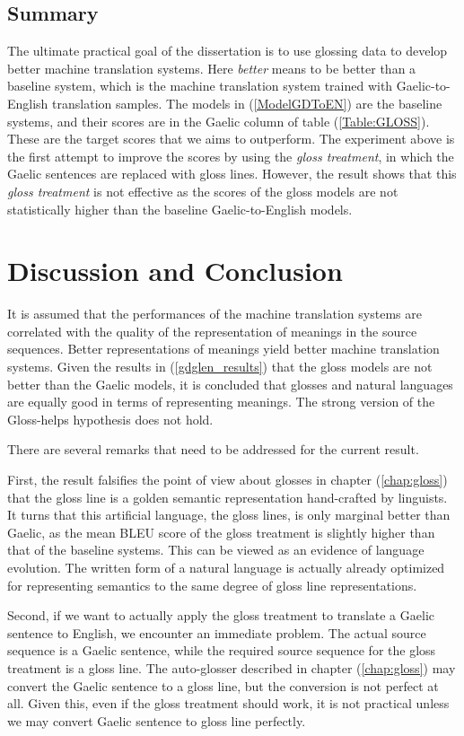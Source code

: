 \documentclass[final]{ua-thesis}
\numberwithin{equation}{section}
\begin{document}
\subsection{Summary}
The ultimate practical goal of the dissertation is to use glossing data to develop better machine translation systems. Here \textit{better} means to be better than a baseline system, which is the machine translation system trained with Gaelic-to-English translation samples. The models in (\ref{ModelGDToEN}) are the baseline systems, and their scores are in the Gaelic column of table (\ref{Table:GLOSS}). These are the target scores that we aims to outperform. The experiment above is the first attempt to improve the scores by using the \textit{gloss treatment}, in which the Gaelic sentences are replaced with gloss lines.  However, the result shows that this \textit{gloss treatment} is not effective as the scores of the gloss models are not statistically higher than the baseline Gaelic-to-English models. 

\section{Discussion and Conclusion}\label{section:cake1_Discussion}
It is assumed that the performances of the machine translation systems are correlated with the quality of the representation of meanings in the source sequences. Better representations of meanings yield better machine translation systems. Given the results in (\ref{gdglen_results}) that the gloss models are not better than the Gaelic models, it is concluded that glosses and natural languages are equally good in terms of representing meanings. The strong version of the Gloss-helps hypothesis does not hold.

There are several remarks that need to be addressed for the current result. 

First, the result falsifies the point of view about glosses in chapter (\ref{chap:gloss}) that the gloss line is a golden semantic representation hand-crafted by linguists.
It turns that this artificial language, the gloss lines, is only marginal better than Gaelic, as the mean BLEU score of the gloss treatment is slightly higher than that of the baseline systems. This can be viewed as an evidence of language evolution.
The written form of a natural language is actually already optimized for representing semantics to the same degree of gloss line representations.

Second, if we want to actually apply the gloss treatment to translate a Gaelic sentence to English, we encounter an immediate problem. The actual source sequence is a Gaelic sentence, while the required source sequence for the gloss treatment is a gloss line. The auto-glosser described in chapter (\ref{chap:gloss}) may convert the Gaelic sentence to a gloss line, but the conversion is not perfect at all. Given this, even if the gloss treatment should work, it is not practical unless we may convert Gaelic sentence to gloss line perfectly.      
\end{document}
